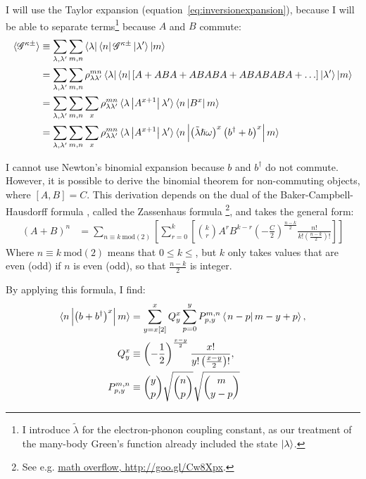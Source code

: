 I will use the Taylor expansion (equation~\ref{eq:inversionexpansion}), because I will be able to separate terms\footnote{I introduce $\tilde{\lambda}$ for the electron-phonon coupling constant, as our treatment of the many-body Green's function already included the state $\ket{\lambda}$.} because $A$ and $B$ commute:
\begin{align*}
\braket{\mathscr{G}^{\kappa\pm}} &\equiv \sum_{\lambda, \lambda^\prime} \sum_{m,n} \bra{\lambda}\bra{n} \mathscr{G}^{\kappa\pm} \ket{\lambda^\prime}\ket{m} \\
&= \sum_{\lambda, \lambda^\prime} \sum_{m,n}\rho_{\lambda\lambda^\prime}^{mn} \bra{\lambda}\bra{n}\left[A + ABA + ABABA + ABABABA + \ldots\right] \ket{\lambda^\prime}\ket{m} \\
&= \sum_{\lambda, \lambda^\prime} \sum_{m,n} \sum_x\rho_{\lambda\lambda^\prime}^{mn} \braket{\lambda \left| A^{x+1} \right| \lambda^\prime} \braket{n\left| B^x \right|m} \\
&= \sum_{\lambda, \lambda^\prime} \sum_{m,n} \sum_x\rho_{\lambda\lambda^\prime}^{mn} \braket{\lambda \left| A^{x+1} \right| \lambda^\prime} \braket{n\left| \left(\tilde{\lambda}\hslash\omega\right)^x\left(b^\dagger+b\right)^x \right|m} \\ 
\end{align*}

I cannot use Newton's binomial expansion because $b$ and $b^\dagger$ do not commute. However, it is possible to derive the binomial theorem for non-commuting objects, where $\left[A,B\right] = C$. This derivation depends on the dual of the Baker-Campbell-Hausdorff formula \cite{kaspermothpoulsen}, called the Zassenhaus formula \footnote{See e.g. \href{http://goo.gl/Cw8Xpx}{math overflow, http://goo.gl/Cw8Xpx}.}, and takes the general form:
\begin{align*}
(A+B)^n &= \sum_{n\equiv k\:\text{mod}(2)}\left[ \sum^k_{r=0}\left[ \binom{k}{r}A^r B^{k-r} \left(-\frac{C}{2}\right)^\frac{n-k}{2} \frac{n!}{k! \left(\frac{n-k}{2}\right)!}\right]\right] 
\end{align*}
Where $n\equiv k\:\text{mod}(2)$ means that $0\leq k\leq$, but $k$ only takes values that are even (odd) if $n$ is even (odd), so that $\frac{n-k}{2}$ is integer.

By applying this formula, I find:
\begin{align*}
\braket{n \left| \left(b+b^\dagger\right)^x \right| m}&= \sum_{y=x[2]}^x Q^x_y \sum_{p=0}^{y} P^{m,n}_{p,y} \braket{\left. n-p \right| m-y+p}, \\
Q^x_y&\equiv \left(-\frac{1}{2}\right)^{\frac{x-y}{2}} \frac{ x! }{ y! \left(\frac{x-y}{2}\right)!},\\
P_{p,y}^{m,n} &\equiv \binom{y}{p} \sqrt{ \binom{n}{p}} \sqrt{\binom{m}{y-p}}
\end{align*}


